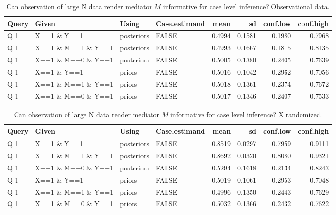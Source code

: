 \documentclass[
  12pt,
]{book}
\begin{document}
\begin{table}

\caption{\label{tab:unnamed-chunk-110}Can observation of large N data render mediator $M$ informative for case level inference? Observational data.}
\centering
\begin{tabular}[t]{l|l|l|l|r|r|r|r}
\hline
Query & Given & Using & Case.estimand & mean & sd & conf.low & conf.high\\
\hline
Q 1 & X==1 \& Y==1 & posteriors & FALSE & 0.4994 & 0.1581 & 0.1980 & 0.7968\\
\hline
Q 1 & X==1 \& M==1 \& Y==1 & posteriors & FALSE & 0.4993 & 0.1667 & 0.1815 & 0.8135\\
\hline
Q 1 & X==1 \& M==0 \& Y==1 & posteriors & FALSE & 0.5005 & 0.1380 & 0.2405 & 0.7639\\
\hline
Q 1 & X==1 \& Y==1 & priors & FALSE & 0.5016 & 0.1042 & 0.2962 & 0.7056\\
\hline
Q 1 & X==1 \& M==1 \& Y==1 & priors & FALSE & 0.5018 & 0.1361 & 0.2374 & 0.7672\\
\hline
Q 1 & X==1 \& M==0 \& Y==1 & priors & FALSE & 0.5017 & 0.1346 & 0.2407 & 0.7533\\
\hline
\end{tabular}
\end{table}

\begin{table}

\caption{\label{tab:unnamed-chunk-110}Can observation of large N data render mediator $M$ informative for case level inference? X randomized.}
\centering
\begin{tabular}[t]{l|l|l|l|r|r|r|r}
\hline
Query & Given & Using & Case.estimand & mean & sd & conf.low & conf.high\\
\hline
Q 1 & X==1 \& Y==1 & posteriors & FALSE & 0.8519 & 0.0297 & 0.7959 & 0.9111\\
\hline
Q 1 & X==1 \& M==1 \& Y==1 & posteriors & FALSE & 0.8692 & 0.0320 & 0.8080 & 0.9321\\
\hline
Q 1 & X==1 \& M==0 \& Y==1 & posteriors & FALSE & 0.5294 & 0.1618 & 0.2134 & 0.8243\\
\hline
Q 1 & X==1 \& Y==1 & priors & FALSE & 0.5019 & 0.1061 & 0.2953 & 0.7048\\
\hline
Q 1 & X==1 \& M==1 \& Y==1 & priors & FALSE & 0.4996 & 0.1350 & 0.2443 & 0.7629\\
\hline
Q 1 & X==1 \& M==0 \& Y==1 & priors & FALSE & 0.5032 & 0.1366 & 0.2432 & 0.7622\\
\hline
\end{tabular}
\end{table}
\end{document}
